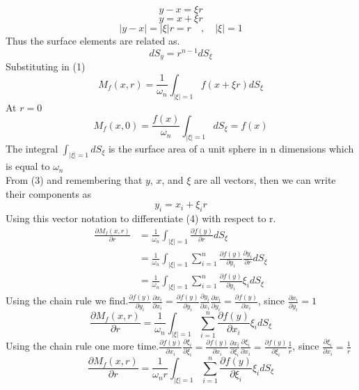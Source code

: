 \documentclass[]{article}
\begin{document}
\[
    y-x = \xi r    
\]
\begin{equation}
y = x + \xi r
\end{equation}
\[
    |y-x| = |\xi|r = r \quad,\quad |\xi| = 1    
\]
Thus the surface elements are related as.
\[
    dS_y = r^{n-1} dS_\xi    
\]
Substituting in (1)
\begin{equation}
M_{f}(x,r) = \frac{1}{\omega_{n}} \int_{|\xi|=1} f(x+\xi r)dS_\xi
\end{equation} 
At $r = 0$
\begin{equation}
M_{f}(x,0) = \frac{f(x)}{\omega_{n}} \int_{|\xi|=1} dS_\xi = f(x)
\end{equation}
The integral $\displaystyle \int_{|\xi|=1} dS_\xi$ is the surface area of a unit sphere in n dimensions which is equal to $\omega_n$
\\
From (3) and remembering that $y$, $x$, and $\xi$ are all vectors, then we can write their components as
\[
    y_i = x_i + \xi_i r    
\]
Using this vector notation to differentiate (4) with respect to r.
\begin{align*}
\frac{\partial M_f (x,r)}{\partial r} &= \frac{1}{\omega_n} \int_{|\xi|=1} \frac{\partial f(y)}{\partial r}dS_\xi
\\
&= \frac{1}{\omega_n} \int_{|\xi|=1} \sum_{i=1}^{n} \frac{\partial f(y)}{\partial y_i}\frac{\partial y_i}{\partial r} dS_\xi
\\
&= \frac{1}{\omega_n} \int_{|\xi|=1} \sum_{i=1}^{n} \frac{\partial f(y)}{\partial y_i}\xi_i dS_\xi
\end{align*}
Using the chain rule we find.$\displaystyle \frac{\partial f(y)}{\partial y_i} \frac{\partial x_i}{\partial x_i} = \frac{\partial f(y)}{\partial y_i} \frac{\partial y_i}{\partial x_i}\frac{\partial x_i}{\partial y_i} = \frac{\partial f(y)}{\partial x_i}$, since $\displaystyle \frac{\partial x_i}{\partial y_i} = 1$
\[
    \frac{\partial M_f (x,r)}{\partial r} = \frac{1}{\omega_n} \int_{|\xi|=1} \sum_{i=1}^{n} \frac{\partial f(y)}{\partial x_i}\xi_i dS_\xi    
\]
Using the chain rule one more time.$\displaystyle \frac{\partial f(y)}{\partial x_i} \frac{\partial \xi_i}{\partial \xi_i}= \frac{\partial f(y)}{\partial x_i}\frac{\partial x_i}{\partial \xi_i}\frac{\partial \xi_i}{\partial x_i} = \frac{\partial f(y)}{\partial \xi_i}\frac{1}{r}$, since $\displaystyle \frac{\partial \xi_i}{\partial x_i} = \frac{1}{r}$
\begin{equation}
\frac{\partial M_f (x,r)}{\partial r} = \frac{1}{\omega_n r} \int_{|\xi|=1} \sum_{i=1}^{n} \frac{\partial f(y)}{\partial \xi_i}\xi_i dS_\xi
\end{equation}
\end{document}
